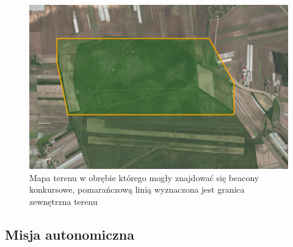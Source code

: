 \begin{figure}[!th]
    \centering
    \includegraphics[width=15cm]{zalaczniki/obrazy/teren.png}
    \caption{Mapa terenu w obrębie którego mogły znajdować się beacony konkursowe, pomarańczową linią wyznaczona jest granica zewnętrzna terenu}
    \label{fig:teren}
\end{figure}

\subsection{Misja autonomiczna}

